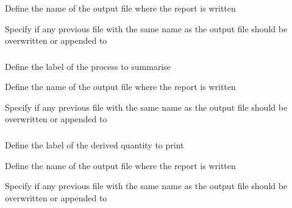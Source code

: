  {Define the name of the output file where the report is written}

 {Specify if any previous file with the same name as the output file should be overwritten or appended to}

\subsubsection[Print a summary of a process]{}

 {Define the label of the process to summarise}

 {Define the name of the output file where the report is written}

 {Specify if any previous file with the same name as the output file should be overwritten or appended to}

\subsubsection[Print a derived quantity]{}

 {Define the label of the derived quantity to print}

 {Define the name of the output file where the report is written}

 {Specify if any previous file with the same name as the output file should be overwritten or appended to}

\subsubsection[Print a summary of the estimated parameters]{}

